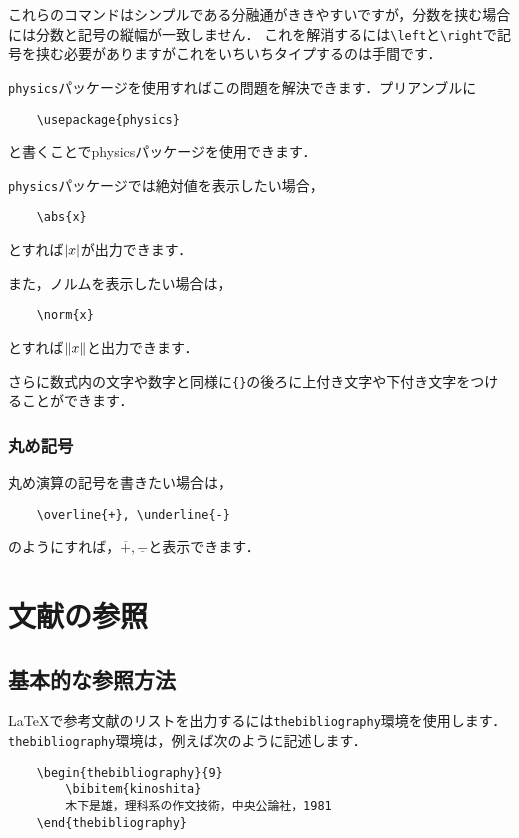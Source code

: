 \documentclass[a4paper,11pt]{jsreport}
\numberwithin{equation}{section}
\theoremstyle{definition}
\begin{document}
これらのコマンドはシンプルである分融通がききやすいですが，分数を挟む場合には分数と記号の縦幅が一致しません．
これを解消するには\verb|\left|と\verb|\right|で記号を挟む必要がありますがこれをいちいちタイプするのは手間です．

\verb|physics|パッケージを使用すればこの問題を解決できます．プリアンブルに
\begin{verbatim}
    \usepackage{physics}
\end{verbatim}
と書くことでphysicsパッケージを使用できます．

\verb|physics|パッケージでは絶対値を表示したい場合，
\begin{verbatim}
    \abs{x}
\end{verbatim}
とすれば$\abs{x}$が出力できます．

また，ノルムを表示したい場合は，
\begin{verbatim}
    \norm{x}
\end{verbatim}
とすれば$\norm{x}$と出力できます．

さらに数式内の文字や数字と同様に\verb|{}|の後ろに上付き文字や下付き文字をつけることができます．

\subsection{丸め記号}

丸め演算の記号を書きたい場合は，
\begin{verbatim}
    \overline{+}, \underline{-}
\end{verbatim}
のようにすれば，$\overline{+},\underline{-}$と表示できます．



\chapter{文献の参照}

\section{基本的な参照方法}

\LaTeX で参考文献のリストを出力するには\verb|thebibliography|環境を使用します\cite{bibunsyo}．
\verb|thebibliography|環境は，例えば次のように記述します．
\begin{verbatim}
    \begin{thebibliography}{9}
        \bibitem{kinoshita}
        木下是雄，理科系の作文技術，中央公論社，1981
    \end{thebibliography}
\end{verbatim}
\end{document}
